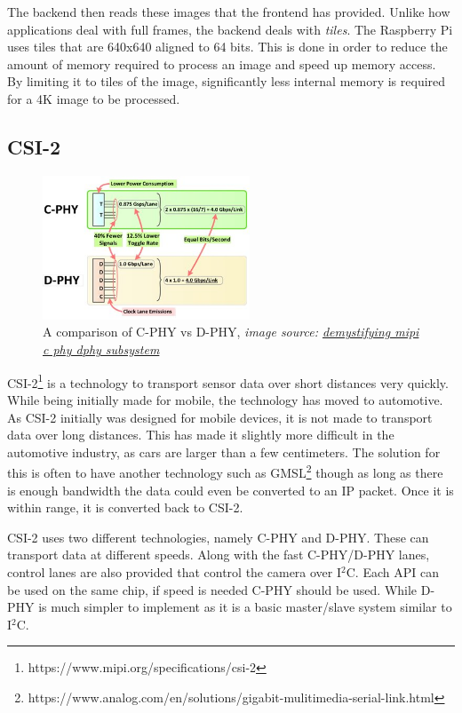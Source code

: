 The backend then reads these images that the frontend has provided. Unlike how
applications deal with full frames, the backend deals with \textit{tiles}. The
Raspberry Pi uses tiles that are 640x640 aligned to 64 bits. This is done in
order to reduce the amount of memory required to process an image and speed up
memory access. By limiting it to tiles of the image, significantly less
internal memory is required for a 4K image to be processed.

\subsection{CSI-2}
\begin{figure}
    \begin{center}
        \includegraphics[width=0.55\textwidth]{figures/cphydphy.jpg}
    \end{center}
    \caption{A comparison of C-PHY vs D-PHY, \textit{image source: \href{https://www.design-reuse.com/articles/43954/demystifying-mipi-c-phy-dphy-subsystem.html}{demystifying mipi c phy dphy subsystem}}}
    \label{fig:cphydphycomparison}
\end{figure}

CSI-2\footnote{https://www.mipi.org/specifications/csi-2} is a technology to
transport sensor data over short distances very quickly. While being initially
made for mobile, the technology has moved to automotive. As CSI-2 initially was designed for
mobile devices, it is not made to transport data over long distances. This has made it
slightly more difficult in the automotive industry, as cars are larger than a
few centimeters. The solution for this is often to have another technology such
as GMSL\footnote{https://www.analog.com/en/solutions/gigabit-mulitimedia-serial-link.html}
though as long as there is enough bandwidth the data could even be converted to
an IP packet. Once it is within range, it is converted back to CSI-2.

CSI-2 uses two different technologies, namely C-PHY and D-PHY. These can
transport data at different speeds. Along with the fast C-PHY/D-PHY lanes,
control lanes are also provided that control the camera over I$^2$C. Each API
can be used on the same chip, if speed is needed C-PHY should be used. While
D-PHY is much simpler to implement as it is a basic master/slave system similar
to I$^2$C.

